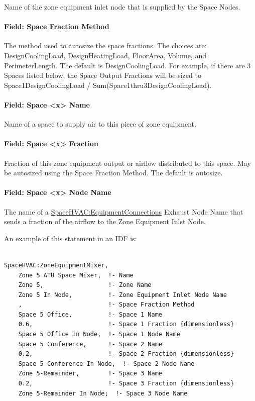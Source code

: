 Name of the zone equipment inlet node that is supplied by the Space Nodes.

\paragraph{Field: Space Fraction Method}\label{field-seqmixer-space-sizing-basis}

The method used to autosize the space fractions. The choices are: DesignCoolingLoad, DesignHeatingLoad, FloorArea, Volume, and PerimeterLength. The default is DesignCoolingLoad.
For example, if there are 3 Spaces listed below, the Space Output Fractions will be sized to Space1DesignCoolingLoad / Sum(Space1thru3DesignCoolingLoad).

\paragraph{Field: Space \textless{}x\textgreater{} Name}\label{field-seqmixer-space-name}

Name of a space to supply air to this piece of zone equipment.

\paragraph{Field: Space \textless{}x\textgreater{} Fraction}\label{field-seqmixer-space-output-fraction}

Fraction of this zone equipment output or airflow distributed to this space. May be autosized using the Space Fraction Method. The default is autosize.

\paragraph{Field: Space \textless{}x\textgreater{} Node Name}\label{field-seqmixer-space-node-name}

The name of a \hyperref[spacehvacequipmentconnections]{SpaceHVAC:EquipmentConnections} Exhaust Node Name that sends a fraction of the airflow to the Zone Equipment Inlst Node.

An example of this statement in an IDF is:

\begin{lstlisting}

SpaceHVAC:ZoneEquipmentMixer,
    Zone 5 ATU Space Mixer,  !- Name
    Zone 5,                  !- Zone Name
    Zone 5 In Node,          !- Zone Equipment Inlet Node Name
    ,                        !- Space Fraction Method
    Space 5 Office,          !- Space 1 Name
    0.6,                     !- Space 1 Fraction {dimensionless}
    Space 5 Office In Node,  !- Space 1 Node Name
    Space 5 Conference,      !- Space 2 Name
    0.2,                     !- Space 2 Fraction {dimensionless}
    Space 5 Conference In Node,  !- Space 2 Node Name
    Zone 5-Remainder,        !- Space 3 Name
    0.2,                     !- Space 3 Fraction {dimensionless}
    Zone 5-Remainder In Node;  !- Space 3 Node Name
\end{lstlisting}

